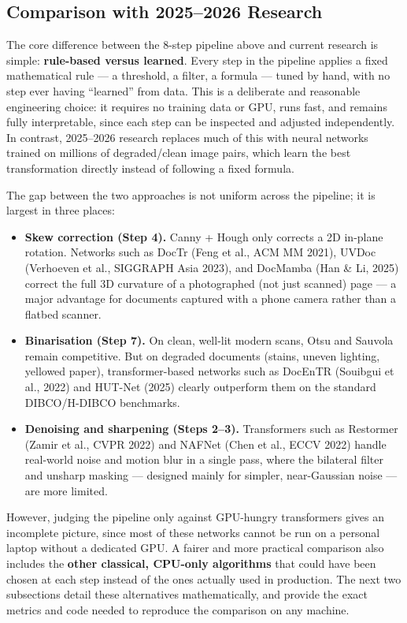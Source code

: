\documentclass[12pt, a4paper]{article}
\begin{document}
\subsection{Comparison with 2025--2026 Research}

The core difference between the 8-step pipeline above and current research is simple: \textbf{rule-based versus learned}. Every step in the pipeline applies a fixed mathematical rule --- a threshold, a filter, a formula --- tuned by hand, with no step ever having ``learned'' from data. This is a deliberate and reasonable engineering choice: it requires no training data or GPU, runs fast, and remains fully interpretable, since each step can be inspected and adjusted independently. In contrast, 2025--2026 research replaces much of this with neural networks trained on millions of degraded/clean image pairs, which learn the best transformation directly instead of following a fixed formula.

The gap between the two approaches is not uniform across the pipeline; it is largest in three places:

\begin{itemize}
  \item \textbf{Skew correction (Step 4).} Canny + Hough only corrects a 2D in-plane rotation. Networks such as DocTr (Feng et al., ACM MM 2021), UVDoc (Verhoeven et al., SIGGRAPH Asia 2023), and DocMamba (Han \& Li, 2025) correct the full 3D curvature of a photographed (not just scanned) page --- a major advantage for documents captured with a phone camera rather than a flatbed scanner.
  \item \textbf{Binarisation (Step 7).} On clean, well-lit modern scans, Otsu and Sauvola remain competitive. But on degraded documents (stains, uneven lighting, yellowed paper), transformer-based networks such as DocEnTR (Souibgui et al., 2022) and HUT-Net (2025) clearly outperform them on the standard DIBCO/H-DIBCO benchmarks.
  \item \textbf{Denoising and sharpening (Steps 2--3).} Transformers such as Restormer (Zamir et al., CVPR 2022) and NAFNet (Chen et al., ECCV 2022) handle real-world noise and motion blur in a single pass, where the bilateral filter and unsharp masking --- designed mainly for simpler, near-Gaussian noise --- are more limited.
\end{itemize}

However, judging the pipeline only against GPU-hungry transformers gives an incomplete picture, since most of these networks cannot be run on a personal laptop without a dedicated GPU. A fairer and more practical comparison also includes the \textbf{other classical, CPU-only algorithms} that could have been chosen at each step instead of the ones actually used in production. The next two subsections detail these alternatives mathematically, and provide the exact metrics and code needed to reproduce the comparison on any machine.
\end{document}
